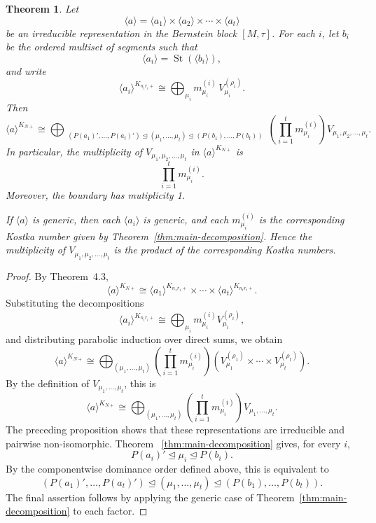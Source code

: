 \documentclass[12pt]{article}
\newtheorem{theorem}{Theorem}[section]
\theoremstyle{remark}
\begin{document}
\begin{theorem}
\label{thm:general-block-decomposition}
Let
$$
\langle a\rangle
=
\langle a_1\rangle
\times
\langle a_2\rangle
\times\cdots\times
\langle a_t\rangle
$$
be an irreducible representation in the Bernstein block
$[M,\tau]$. For each $i$, let $b_i$ be the ordered
multiset of segments such that
$$
\langle a_i\rangle
=
\operatorname{St}(\langle b_i\rangle),
$$
and write
$$
\langle a_i\rangle^{K_{n_i r_i+}}
\cong
\bigoplus_{\mu_i}
m^{(i)}_{\mu_i}\,
V^{(\rho_i)}_{\mu_i}.
$$
Then
$$
\langle a\rangle^{K_{N+}}
\cong
\bigoplus_{\substack{
(P(a_1)',\dots,P(a_t)')
\unlhd
(\mu_1,\dots,\mu_t)
\unlhd
(P(b_1),\dots,P(b_t))
}}
\left(
\prod_{i=1}^{t}m^{(i)}_{\mu_i}
\right)
V_{\mu_1,\mu_2,\dots,\mu_t}.
$$
In particular, the multiplicity of
$V_{\mu_1,\mu_2,\dots,\mu_t}$ in
$\langle a\rangle^{K_{N+}}$ is
$$
\prod_{i=1}^{t}m^{(i)}_{\mu_i}.
$$
Moreover, the boundary has mutiplicity 1.

If $\langle a\rangle$ is generic, then each
$\langle a_i\rangle$ is generic, and each
$m^{(i)}_{\mu_i}$ is the corresponding Kostka number given by
Theorem~\ref{thm:main-decomposition}. Hence the multiplicity of
$V_{\mu_1,\mu_2,\dots,\mu_t}$ is the product of the
corresponding Kostka numbers.
\end{theorem}

\begin{proof}
By Theorem~4.3,
$$
\langle a\rangle^{K_{N+}}
\cong
\langle a_1\rangle^{K_{n_1r_1+}}
\times\cdots\times
\langle a_t\rangle^{K_{n_tr_t+}}.
$$
Substituting the decompositions
$$
\langle a_i\rangle^{K_{n_ir_i+}}
\cong
\bigoplus_{\mu_i}
m^{(i)}_{\mu_i}V^{(\rho_i)}_{\mu_i},
$$
and distributing parabolic induction over direct sums, we obtain
$$
\langle a\rangle^{K_{N+}}
\cong
\bigoplus_{(\mu_1,\dots,\mu_t)}
\left(
\prod_{i=1}^{t}m^{(i)}_{\mu_i}
\right)
\left(
V^{(\rho_1)}_{\mu_1}
\times\cdots\times
V^{(\rho_t)}_{\mu_t}
\right).
$$
By the definition of $V_{\mu_1,\dots,\mu_t}$, this is
$$
\langle a\rangle^{K_{N+}}
\cong
\bigoplus_{(\mu_1,\dots,\mu_t)}
\left(
\prod_{i=1}^{t}m^{(i)}_{\mu_i}
\right)
V_{\mu_1,\dots,\mu_t}.
$$
The preceding proposition shows that these representations are
irreducible and pairwise non-isomorphic. Theorem~
\ref{thm:main-decomposition} gives, for every $i$,
$$
P(a_i)'\unlhd\mu_i\unlhd P(b_i).
$$
By the componentwise dominance order defined above, this is
equivalent to
$$
(P(a_1)',\dots,P(a_t)')
\unlhd
(\mu_1,\dots,\mu_t)
\unlhd
(P(b_1),\dots,P(b_t)).
$$
The final assertion follows by applying the generic case of
Theorem~\ref{thm:main-decomposition} to each factor.
\end{proof}
\end{document}
